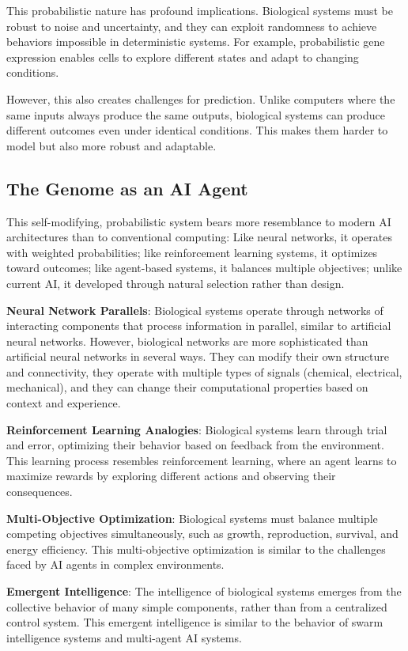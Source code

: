 \documentclass[11pt]{article}
\begin{document}
This probabilistic nature has profound implications. Biological systems must be robust to noise and uncertainty, and they can exploit randomness to achieve behaviors impossible in deterministic systems. For example, probabilistic gene expression enables cells to explore different states and adapt to changing conditions.

However, this also creates challenges for prediction. Unlike computers where the same inputs always produce the same outputs, biological systems can produce different outcomes even under identical conditions. This makes them harder to model but also more robust and adaptable.

\subsection{The Genome as an AI Agent}

This self-modifying, probabilistic system bears more resemblance to modern AI architectures than to conventional computing: Like neural networks, it operates with weighted probabilities; like reinforcement learning systems, it optimizes toward outcomes; like agent-based systems, it balances multiple objectives; unlike current AI, it developed through natural selection rather than design.

\textbf{Neural Network Parallels}: Biological systems operate through networks of interacting components that process information in parallel, similar to artificial neural networks. However, biological networks are more sophisticated than artificial neural networks in several ways. They can modify their own structure and connectivity, they operate with multiple types of signals (chemical, electrical, mechanical), and they can change their computational properties based on context and experience.

\textbf{Reinforcement Learning Analogies}: Biological systems learn through trial and error, optimizing their behavior based on feedback from the environment. This learning process resembles reinforcement learning, where an agent learns to maximize rewards by exploring different actions and observing their consequences.

\textbf{Multi-Objective Optimization}: Biological systems must balance multiple competing objectives simultaneously, such as growth, reproduction, survival, and energy efficiency. This multi-objective optimization is similar to the challenges faced by AI agents in complex environments.

\textbf{Emergent Intelligence}: The intelligence of biological systems emerges from the collective behavior of many simple components, rather than from a centralized control system. This emergent intelligence is similar to the behavior of swarm intelligence systems and multi-agent AI systems.
\end{document}
